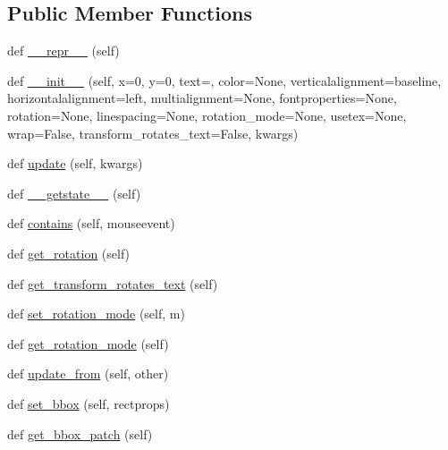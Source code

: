\subsection*{Public Member Functions}
\begin{DoxyCompactItemize}
\item 
def \hyperlink{classmatplotlib_1_1text_1_1Text_a65f374b3f06264e9c4efeb80eeab07a0}{\+\_\+\+\_\+repr\+\_\+\+\_\+} (self)
\item 
def \hyperlink{classmatplotlib_1_1text_1_1Text_ab689426358cf8b6e12de4d15238b4925}{\+\_\+\+\_\+init\+\_\+\+\_\+} (self, x=0, y=0, text=\textquotesingle{}\textquotesingle{}, color=None, verticalalignment=\textquotesingle{}baseline\textquotesingle{}, horizontalalignment=\textquotesingle{}left\textquotesingle{}, multialignment=None, fontproperties=None, rotation=None, linespacing=None, rotation\+\_\+mode=None, usetex=None, wrap=False, transform\+\_\+rotates\+\_\+text=False, kwargs)
\item 
def \hyperlink{classmatplotlib_1_1text_1_1Text_a2479817b5993015028fcd9d2c58affab}{update} (self, kwargs)
\item 
def \hyperlink{classmatplotlib_1_1text_1_1Text_a32d4ae9308c5b63422c8b57d52d076f9}{\+\_\+\+\_\+getstate\+\_\+\+\_\+} (self)
\item 
def \hyperlink{classmatplotlib_1_1text_1_1Text_a95c31a1a771a7c2a8acceb40aad54c56}{contains} (self, mouseevent)
\item 
def \hyperlink{classmatplotlib_1_1text_1_1Text_a816b4d8bdeaa871274f82257f83e6dff}{get\+\_\+rotation} (self)
\item 
def \hyperlink{classmatplotlib_1_1text_1_1Text_a9e36f612c62d58ec248102adc8725121}{get\+\_\+transform\+\_\+rotates\+\_\+text} (self)
\item 
def \hyperlink{classmatplotlib_1_1text_1_1Text_a60c6f4ced70cab87ba7c8fc2b9f11b6f}{set\+\_\+rotation\+\_\+mode} (self, m)
\item 
def \hyperlink{classmatplotlib_1_1text_1_1Text_a96b57cf80cb639db7399752d21a368df}{get\+\_\+rotation\+\_\+mode} (self)
\item 
def \hyperlink{classmatplotlib_1_1text_1_1Text_a15a39eae4373b8dcbeb83cde53554ac8}{update\+\_\+from} (self, other)
\item 
def \hyperlink{classmatplotlib_1_1text_1_1Text_ab36ae76ec16c78de0e3df01d00dfc61d}{set\+\_\+bbox} (self, rectprops)
\item 
def \hyperlink{classmatplotlib_1_1text_1_1Text_ac434e68c06655b36531a0118faa61c8f}{get\+\_\+bbox\+\_\+patch} (self)
\item 

\end{DoxyCompactItemize}
